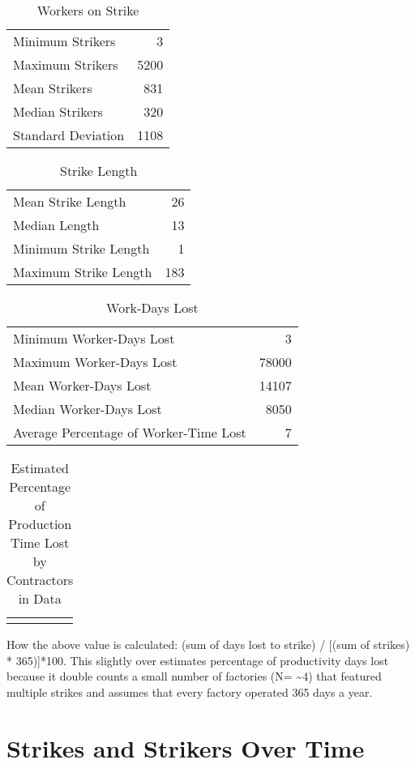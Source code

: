 \documentclass[
]{article}
\begin{document}
\begin{longtable}[]{@{}lr@{}}
\caption{Workers on Strike}\tabularnewline
\toprule\noalign{}
\endfirsthead
\endhead
\bottomrule\noalign{}
\endlastfoot
Minimum Strikers & 3 \\
Maximum Strikers & 5200 \\
Mean Strikers & 831 \\
Median Strikers & 320 \\
Standard Deviation & 1108 \\
\end{longtable}

\begin{longtable}[]{@{}lr@{}}
\caption{Strike Length}\tabularnewline
\toprule\noalign{}
\endfirsthead
\endhead
\bottomrule\noalign{}
\endlastfoot
Mean Strike Length & 26 \\
Median Length & 13 \\
Minimum Strike Length & 1 \\
Maximum Strike Length & 183 \\
\end{longtable}

\begin{longtable}[]{@{}lr@{}}
\caption{Work-Days Lost}\tabularnewline
\toprule\noalign{}
\endfirsthead
\endhead
\bottomrule\noalign{}
\endlastfoot
Minimum Worker-Days Lost & 3 \\
Maximum Worker-Days Lost & 78000 \\
Mean Worker-Days Lost & 14107 \\
Median Worker-Days Lost & 8050 \\
Average Percentage of Worker-Time Lost & 7 \\
\end{longtable}

\begin{longtable}[]{@{}r@{}}
\caption{Estimated Percentage of Production Time Lost by Contractors in
Data}\tabularnewline
\toprule\noalign{}
\endfirsthead
\endhead
\bottomrule\noalign{}
\endlastfoot
6.795091 \\
\end{longtable}

How the above value is calculated: (sum of days lost to strike) /
{[}(sum of strikes) * 365){]}*100. This slightly over estimates
percentage of productivity days lost because it double counts a small
number of factories (N= \textasciitilde4) that featured multiple strikes
and assumes that every factory operated 365 days a year.

\section{Strikes and Strikers Over
Time}\label{strikes-and-strikers-over-time}
\end{document}
